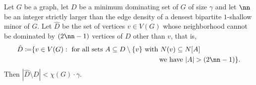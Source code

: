 \begin{lemma}\label{lenzen-improved}
  Let $G$ be a graph, let $D$ be a minimum dominating set of $G$ of
  size $\gamma$ and let $\nn$ be an integer strictly larger than the
  edge density of a densest bipartite $1$-shallow minor of $G$. Let
  $\hat{D}$ be the set of vertices $v\in V(G)$ whose neighborhood
  cannot be dominated by $(2\nn-1)$ vertices of $D$ other than $v$,
  that is,
  \begin{align*}
    \hat{D}\coloneqq & \{v\in V(G) : \text{ for all sets }
      A\subseteq D\setminus \{v\} \text{ with } N(v)\subseteq N[A] \\
      & \hspace{6.5cm}\text{we have }|A|> (2\nn-1)\}.
  \end{align*}
  Then $|\hat{D}\setminus D| < \chi(G)\cdot\gamma$.
\end{lemma}

